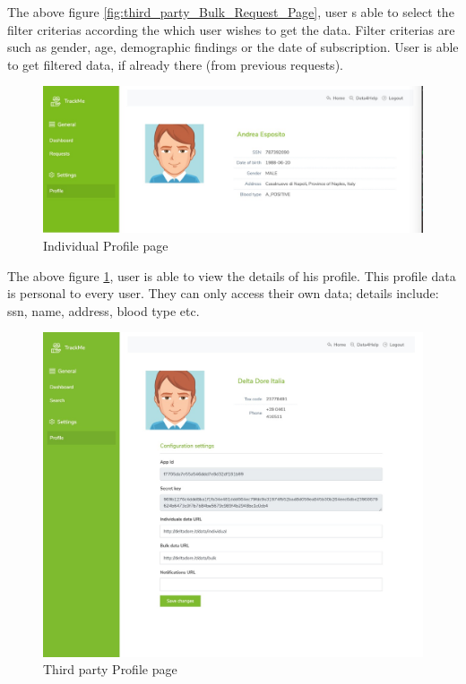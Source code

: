 \documentclass[a4paper, hidelinks, 12pt]{report}
\begin{document}
	The above figure \ref{fig:third_party_Bulk_Request_Page}, user s able to select the filter criterias according the which user wishes to get the data. Filter criterias are such as gender, age, demographic findings or the date of subscription. User is able to get filtered data, if already there (from previous requests).
	
	\begin{figure}[H]
		\centering
		\includegraphics[width=1\textwidth]{UI/UI/3.jpeg}
		\caption[UI: Individual Profile page]{Individual Profile page}
		\label{fig:user_profile_individual}
	\end{figure}
	
	The above figure \ref{fig:user_profile_individual}, user is able to view the details of his profile. This profile data is personal to every user. They can only access their own data; details include: ssn, name, address, blood type etc.
	
	\begin{figure}[H]
		\centering
		\includegraphics[width=1\textwidth]{UI/UI/8.jpeg}
		\caption[UI: Third party Profile page]{Third party Profile page}
		\label{fig:user_profile_thirdparty}
	\end{figure}
	
\end{document}
